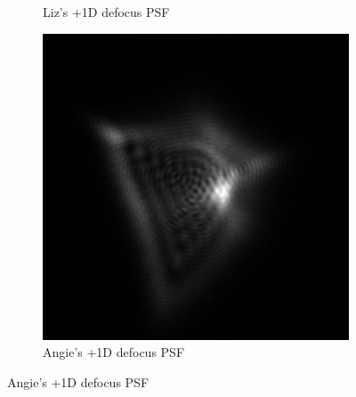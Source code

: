 \documentclass{article}
\begin{document}
\begin{figure}[H]
\begin{subfigure}{.3\textwidth}
  \caption{Liz's +1D defocus PSF}
  \label{fig:liz1dpsf}
\end{subfigure}
\begin{subfigure}{.3\textwidth}
  \centering
  \includegraphics[width=1\linewidth]{Angie_R_0526_1_500_zer_1_5_PSF.png}
  \caption{Angie's +1D defocus PSF}
  \label{fig:angie1dpsf}
\end{subfigure}

\medskip


\end{figure}
\end{document}
